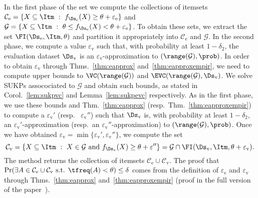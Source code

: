 In the first phase of the set we compute the collections of itemsets
$\mathcal{C}_\mathrm{e}=\{X\subseteq\Itm ~:~
f_{\Ds_\mathrm{e}}(X)\ge\theta+\varepsilon_\mathrm{e}\}$
and $\mathcal{G}=\{X\subseteq\Itm ~:~ \theta\le
f_{\Ds_\mathrm{e}}(X)<\theta+\varepsilon_\mathrm{e}\}$. To obtain these sets, we
extract the set $\FI(\Ds_\mathrm{e},\Itm,\theta)$ and partition it appropriately
into $\mathcal{C}_\mathrm{e}$ and $\mathcal{G}$.
In the second phase, we compute a value $\varepsilon_\mathrm{v}$ such that, with
probability at least $1-\delta_2$, the evaluation dataset $\Ds_\mathrm{v}$ is an
$\varepsilon_\mathrm{v}$-approximation to $(\range(\mathcal{G}),\prob)$. In
order to obtain $\varepsilon_\mathrm{v}$ through 
Thms.~\ref{thm:eapprox} and~\ref{thm:eapproxempir}, we need to compute upper
bounds to $\VC(\range(\mathcal{G}))$ and
$\EVC(\range(\mathcal{G}),\Ds_\mathrm{v})$. We solve SUKPs assocociated to
$\mathcal{G}$ and obtain such bounds, as stated in Corol.~\ref{lem:sukpvc} and
Lemma~\ref{lem:sukpevc} respectively. As in the
first phase, we use these bounds and Thm.~\ref{thm:eapprox}
(resp.~Thm.~\ref{thm:eapproxempir}) to compute a
$\varepsilon_\mathrm{v}'$ (resp.~ $\varepsilon_\mathrm{v}''$) such that
$\Ds_\mathrm{v}$ is, with probability at least $1-\delta_2$, an
$\varepsilon_\mathrm{v}'$-approximation (resp.~an
$\varepsilon_\mathrm{v}''$-approximation) to $(\range(\mathcal{G}),\prob)$. Once
we have obtained
$\varepsilon_\mathrm{v}=\min\{\varepsilon_\mathrm{v}',\varepsilon_\mathrm{v}''\}$,
we compute the set
\[
\mathcal{C}_\mathrm{v}=\{X\subseteq\Itm ~:~ X\in\mathcal{G} \mbox{ and }
f_{\Ds_\mathrm{v}}(X)\ge\theta+\varepsilon''\}=\mathcal{G}\cap\FI(\Ds_\mathrm{v},\Itm,\theta+\varepsilon_\mathrm{v}).\]
The method returns the collection of itemsets $\mathcal{C}_\mathrm{e}\cup\mathcal{C}_\mathrm{v}$.
The proof that $\Pr(\exists
A\in\mathcal{C}_\mathrm{e}\cup\mathcal{C}_\mathrm{v} \mbox{ s.t. }
\tfreq(A)<\theta)\le\delta$ comes from the definition of $\varepsilon_\mathrm{e}$ and
$\varepsilon_\mathrm{v}$ through Thms.~\ref{thm:eapprox}
and~\ref{thm:eapproxempir} (proof in the full version
of the paper~\citep{RiondatoV13}).


